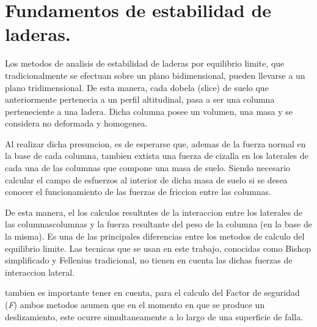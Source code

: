 \chapter{Fundamentos de estabilidad de laderas.}
Los metodos de analisis de estabilidad de laderas por equilibrio limite, que tradicionalmente se efectuan sobre un plano bidimensional, pueden llevarse a un plano tridimensional.
De esta manera, cada dobela (slice) de suelo  que anteriormente pertenecia a un perfil altitudinal, pasa a ser una columna perteneciente a una ladera. Dicha columna posee un volumen, una masa y se considera no deformada y homogenea.

Al realizar dicha presuncion, es de esperarse que, ademas de la fuerza normal en la base de cada columna, tambien extista una fuerza de cizalla en los laterales de cada una de las columnas que compone una masa de suelo. Siendo necesario calcular el campo de esfuerzos al interior de dicha masa de suelo si se desea conocer el funcionamiento de las fuerzas de friccion entre las columnas.

De esta manera, el los calculos resultntes de la interaccion entre los laterales de las columnascolumnas y la fuerza resultante del peso de la columna (en la base de la misma). Es una de las principales diferencias entre los metodos de calculo del equilibrio limite. Las tecnicas que se usan en este trabajo, conocidas como Bishop simplificado y Fellenius tradicional, no tienen en cuenta las dichas fuerzas de interaccion lateral.

tambien es importante tener en cuenta, para el calculo del Factor de seguridad (\textit{F}) ambos metodos asumen que en el momento en que se produce un deslizamiento, este ocurre simultaneamente a lo largo de una superficie de falla.

